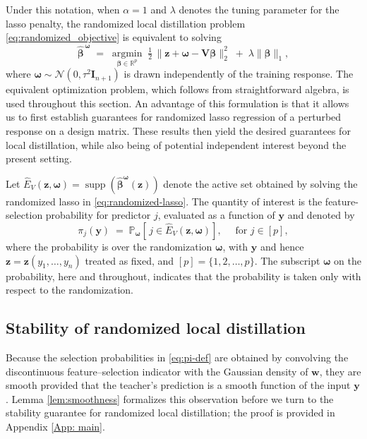 \documentclass[12pt]{article}
\newcommand{\R}{\mathbb{R}}
\newcommand{\PPo}{\mathbb{P}_{\bm{\omega}}}
\newcommand{\Ehat}{\widehat{E}}
\newcommand{\bhat}{\widehat{\beta}}
\newcommand{\norm}[1]{\lVert #1 \rVert}
\theoremstyle{definition}
\begin{document}
Under this notation, when $\alpha=1$ and $\lambda$ denotes the tuning parameter for the lasso penalty, the randomized local distillation problem \eqref{eq:randomized_objective} is equivalent to solving 
\begin{equation}
\label{eq:randomized-lasso}
  \bm{\bhat}^{\,\bm{\omega}}
  \;=\;
  \operatorname*{argmin}_{\bm{\beta} \in \R^{p}}
  \; \tfrac{1}{2}\,\norm{\bm{z} + \bm{\omega} - \bm{V}\bm{\beta}}_{2}^{2}
  \;+\; \lambda \norm{\bm{\beta}}_{1},
\end{equation}
where $\bm{\omega}\sim \mathcal{N}(0, \tau^2 \bm{I}_{n+1})$ is drawn independently of the training response.
The equivalent optimization problem, which follows from straightforward algebra, is used throughout this section. 
An advantage of this formulation is that it allows us to first establish guarantees for randomized lasso regression of a perturbed response on a design matrix. These results then yield the desired guarantees for local distillation, while also being of potential independent interest beyond the present setting.

Let $\widehat E_V(\boldsymbol z,\boldsymbol\omega)=\operatorname{supp}\!\left(\widehat{\boldsymbol\beta}^{\boldsymbol\omega}(\boldsymbol z)\right)$
denote the active set obtained by solving the randomized lasso in \eqref{eq:randomized-lasso}.
The quantity of interest is the feature-selection probability for predictor $j$, evaluated as a function of $\bm{y}$ and denoted by
\begin{equation}
\label{eq:pi-def}
  \pi_j(\bm{y})
  \;=\;
  \PPo\!\left[\, j \in \Ehat_V(\bm{z},\bm{\omega})\right],
  \quad \text{ for } j \in [p],
\end{equation}
where the probability is over the randomization $\bm{\omega}$, with $\bm{y}$ and hence $\bm{z}=\bm{z}(y_1,\ldots, y_n)$ treated as fixed, and $[p]=\{1,2,\ldots, p\}$. 
The subscript $\bm{\omega}$ on the probability, here and throughout, indicates that the probability is taken only with respect to the randomization.



\subsection{Stability of randomized local distillation}
\label{sec:stability-main}

Because the selection probabilities in \eqref{eq:pi-def} are obtained by convolving the discontinuous feature--selection indicator with the Gaussian density of $\bm{w}$, they are smooth provided that the teacher's prediction is a smooth function of the input $\bm{y}$. 
Lemma \ref{lem:smoothness} formalizes this observation before we turn to the stability guarantee for randomized local distillation; the proof is provided in Appendix \ref{App: main}.
\end{document}
